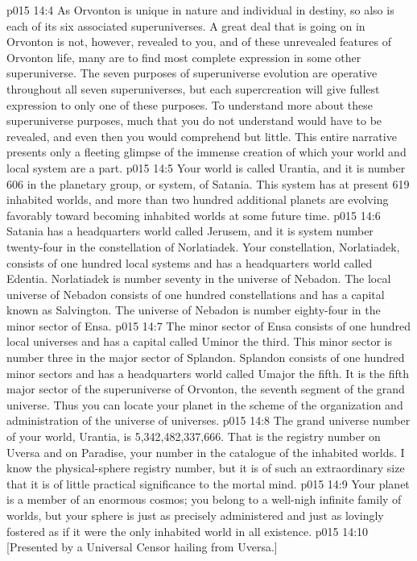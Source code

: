 \vs p015 14:4 As Orvonton is unique in nature and individual in destiny, so also is each of its six associated superuniverses. A great deal that is going on in Orvonton is not, however, revealed to you, and of these unrevealed features of Orvonton life, many are to find most complete expression in some other superuniverse. The seven purposes of superuniverse evolution are operative throughout all seven superuniverses, but each supercreation will give fullest expression to only one of these purposes. To understand more about these superuniverse purposes, much that you do not understand would have to be revealed, and even then you would comprehend but little. This entire narrative presents only a fleeting glimpse of the immense creation of which your world and local system are a part.
\vs p015 14:5 \pc Your world is called Urantia, and it is number 606 in the planetary group, or system, of Satania. This system has at present 619 inhabited worlds, and more than two hundred additional planets are evolving favorably toward becoming inhabited worlds at some future time.
\vs p015 14:6 Satania has a headquarters world called Jerusem, and it is system number twenty\hyp{}four in the constellation of Norlatiadek. Your constellation, Norlatiadek, consists of one hundred local systems and has a headquarters world called Edentia. Norlatiadek is number seventy in the universe of Nebadon. The local universe of Nebadon consists of one hundred constellations and has a capital known as Salvington. The universe of Nebadon is number eighty\hyp{}four in the minor sector of Ensa.
\vs p015 14:7 The minor sector of Ensa consists of one hundred local universes and has a capital called Uminor the third. This minor sector is number three in the major sector of Splandon. Splandon consists of one hundred minor sectors and has a headquarters world called Umajor the fifth. It is the fifth major sector of the superuniverse of Orvonton, the seventh segment of the grand universe. Thus you can locate your planet in the scheme of the organization and administration of the universe of universes.
\vs p015 14:8 The grand universe number of your world, Urantia, is 5,342,482,337,666. That is the registry number on Uversa and on Paradise, your number in the catalogue of the inhabited worlds. I know the physical\hyp{}sphere registry number, but it is of such an extraordinary size that it is of little practical significance to the mortal mind.
\vs p015 14:9 \pc Your planet is a member of an enormous cosmos; you belong to a well\hyp{}nigh infinite family of worlds, but your sphere is just as precisely administered and just as lovingly fostered as if it were the only inhabited world in all existence.
\vsetoff
\vs p015 14:10 [Presented by a Universal Censor hailing from Uversa.]
